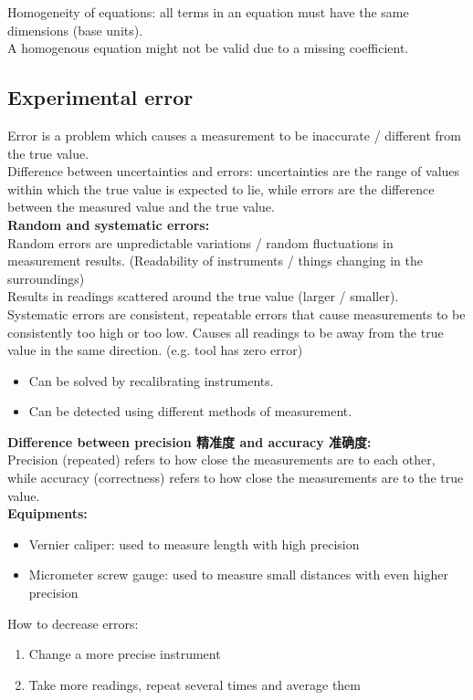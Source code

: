 Homogeneity of equations: all terms in an equation must have the same dimensions (base units).\\
A homogenous equation might not be valid due to a missing coefficient.
\subsection{Experimental error}
Error is a problem which causes a measurement to be inaccurate / different from the true value.\\
Difference between uncertainties and errors: uncertainties are the range of values within which the true value is expected to lie, while errors are the difference between the measured value and the true value.\\
\textbf{Random and systematic errors:} \\
Random errors are unpredictable variations / random fluctuations in measurement results. (Readability of instruments / things changing in the surroundings) \\Results in readings scattered around the true value (larger / smaller). \\
Systematic errors are consistent, repeatable errors that cause measurements to be consistently too high or too low. Causes all readings to be away from the true value in the same direction. (e.g. tool has zero error) 
\begin{itemize}
  \item Can be solved by recalibrating instruments.
  \item Can be detected using different methods of measurement.
\end{itemize} 
\textbf{Difference between precision 精准度 and accuracy 准确度:} \\
Precision (repeated) refers to how close the measurements are to each other, while accuracy (correctness) refers to how close the measurements are to the true value.\\
\textbf{Equipments:}
\begin{itemize}
  \item Vernier caliper: used to measure length with high precision
  \item Micrometer screw gauge: used to measure small distances with even higher precision
\end{itemize}
How to decrease errors:
\begin{enumerate}
  \item Change a more precise instrument
  \item Take more readings, repeat several times and average them
\end{enumerate}
